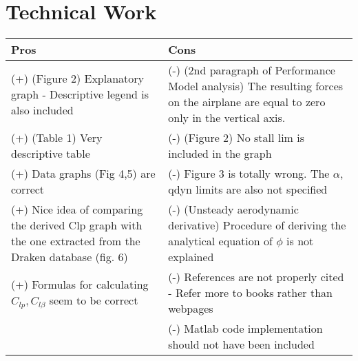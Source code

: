 \section{Technical Work}
\begin{table}[H]
  \centering
    \begin{tabular}{p{7cm}|p{7cm}}
    \toprule
    \textbf{Pros} & \textbf{Cons} \\
    \midrule
    (+) (Figure 2) Explanatory graph - Descriptive legend is also included & (-) (2nd paragraph of Performance Model analysis) The resulting forces on the airplane are equal to zero  only in the vertical axis. \\
    (+) (Table 1) Very descriptive table & (-) (Figure 2) No stall  lim is included in the graph \\
    (+) Data graphs (Fig 4,5) are correct  & (-) Figure 3 is totally wrong. The $\alpha$, qdyn limits are also not specified \\
    (+) Nice idea of comparing the derived Clp graph with the one extracted from the Draken database (fig. 6)  & (-) (Unsteady aerodynamic derivative) Procedure of deriving the analytical equation of $\phi$ is not explained \\
    (+) Formulas for calculating $C_{lp}, C_{l\beta}$ seem to be correct & (-) References are not properly cited - Refer more to books rather than webpages \\
          & (-) Matlab code implementation should not have been included \\
    \bottomrule
    \end{tabular}%
\end{table}%
